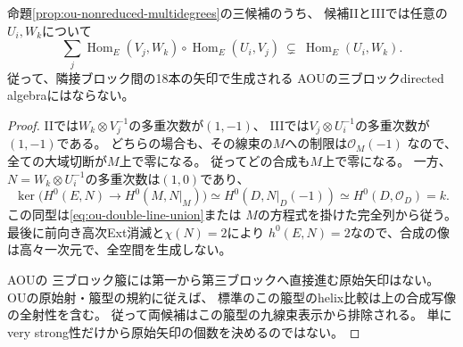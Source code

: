 \begin{lemma}[非被約型における合成の生成性の障害]
\label{lem:ou-double-line-composition}
命題\ref{prop:ou-nonreduced-multidegrees}の三候補のうち、
候補IIとIIIでは任意の$U_i,W_k$について
\[
 \sum_j
 \operatorname{Hom}_E(V_j,W_k)\circ
 \operatorname{Hom}_E(U_i,V_j)
 \ \subsetneq\ \operatorname{Hom}_E(U_i,W_k).
\]
従って、隣接ブロック間の18本の矢印で生成される
AOUの三ブロックdirected algebraにはならない。
\end{lemma}
\begin{proof}
IIでは$W_k\otimes V_j^{-1}$の多重次数が$(1,-1)$、
IIIでは$V_j\otimes U_i^{-1}$の多重次数が$(1,-1)$である。
どちらの場合も、その線束の$M$への制限は$\mathcal O_M(-1)$
なので、全ての大域切断が$M$上で零になる。
従ってどの合成も$M$上で零になる。
一方、$N=W_k\otimes U_i^{-1}$の多重次数は$(1,0)$であり、
\[
 \ker\bigl(H^0(E,N)\to H^0(M,N|_M)\bigr)
 \simeq H^0(D,N|_D(-1))
 \simeq H^0(D,\mathcal O_D)=k.
\]
この同型は\eqref{eq:ou-double-line-union}または
$M$の方程式を掛けた完全列から従う。
最後に前向き高次Ext消滅と$\chi(N)=2$により
$h^0(E,N)=2$なので、合成の像は高々一次元で、全空間を生成しない。

AOU\cite[Figure~4.1, (4.2), Definition~4.1]{AOU2024}の
三ブロック箙には第一から第三ブロックへ直接進む原始矢印はない。
OU\cite[(5.3), Definition~5.2]{OU}の原始射・箙型の規約に従えば、
標準のこの箙型のhelix比較は上の合成写像の全射性を含む。
従って両候補はこの箙型の九線束表示から排除される。
単にvery strong性だけから原始矢印の個数を決めるのではない。
\end{proof}

